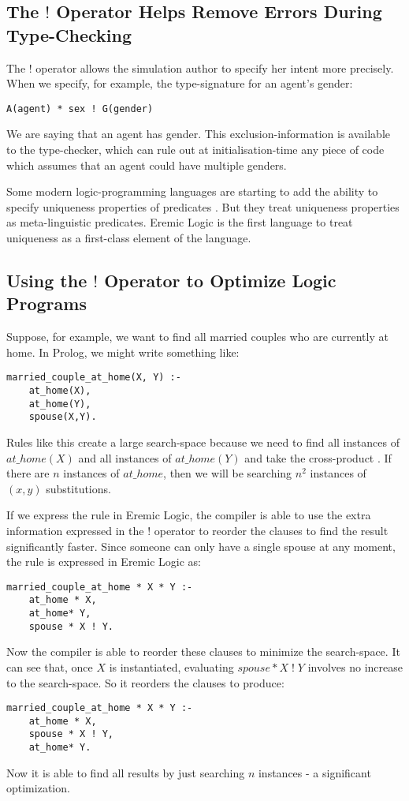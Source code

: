 \subsection{The $!$ Operator Helps Remove Errors During Type-Checking}
The $!$ operator allows the simulation author to specify her intent more precisely.
When we specify, for example, the type-signature for an agent's gender:
\begin{verbatim}
A(agent) * sex ! G(gender)
\end{verbatim}
We are saying that an agent has  gender.
This exclusion-information is available to the type-checker, which can rule out at initialisation-time any piece of code which assumes that an agent could have multiple genders. 

Some modern logic-programming languages are starting to add the ability to specify uniqueness properties of predicates \cite{mercury}. 
But they treat uniqueness properties as meta-linguistic predicates. 
Eremic Logic is the first language to treat uniqueness as a first-class element of the language.

\subsection{Using the $!$ Operator to Optimize Logic Programs}
Suppose, for example, we want to find all married couples who are currently at home.
In Prolog, we might write something like:
\begin{verbatim}
married_couple_at_home(X, Y) :-
    at_home(X),
    at_home(Y),
    spouse(X,Y).
\end{verbatim}	
Rules like this create a large search-space because we need to find all instances of $at\_home(X)$ and all instances of  $at\_home(Y)$ and take the cross-product \cite{smith-and-genesereth}. If there are $n$ instances of $at\_home$, then we will be searching $n^2$ instances of $(x,y)$ substitutions.

If we express the rule in Eremic Logic, the compiler is able to use the extra information expressed in the $!$ operator to reorder the clauses to find the result significantly faster.
Since someone can only have a single spouse at any moment, the rule is expressed in Eremic Logic as:
\begin{verbatim}
married_couple_at_home * X * Y :-
    at_home * X,
    at_home* Y,
    spouse * X ! Y.
\end{verbatim}	
Now the compiler is able to reorder these clauses to minimize the search-space. 
It can see that, once $X$ is instantiated, evaluating $spouse * X \; ! \; Y$ involves no increase to the search-space.
So it reorders the clauses to produce:
\begin{verbatim}
married_couple_at_home * X * Y :-
    at_home * X,
    spouse * X ! Y,
    at_home* Y.
\end{verbatim}	
Now it is able to find all results by just searching $n$ instances - a significant optimization.

